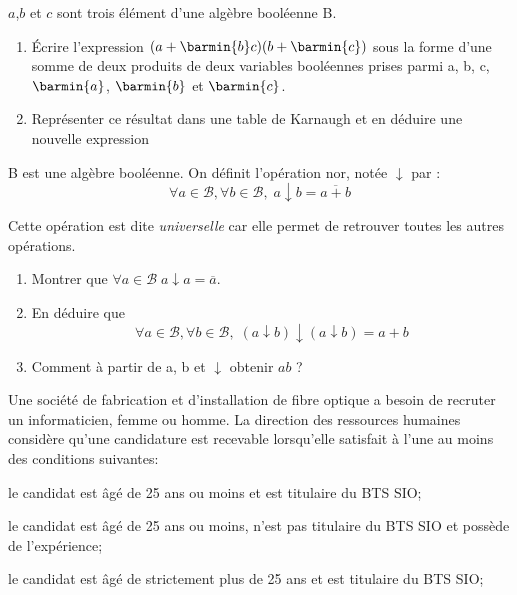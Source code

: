 \documentclass[a4paper,12pt,french]{article}
\begin{document}
\exo{}


$a$,$b$ et $c$ sont trois élément d'une algèbre booléenne B.

\begin{enumerate}[\bfseries 1.]
	\item 	\'Ecrire  l'expression $(a+\barmin{b}c)(b+\barmin{c})$ sous la forme d'une somme de deux produits de deux variables booléennes prises parmi a, b, c, $\barmin{a}
	$, $\barmin{b}$ et $\barmin{c}$.
	\item 	Représenter ce résultat dans une table de Karnaugh et en déduire une nouvelle expression\\
\end{enumerate}

\exo{}

B est une algèbre booléenne. On définit l'opération \og nor\fg{}, notée $\downarrow$ par : $$\forall a\in\mathcal{B},\forall b\in\mathcal{B},\; a\downarrow b = \overline{a+b}$$

Cette opération est dite \textit{universelle} car elle permet de retrouver toutes les autres opérations.

\begin{enumerate}[\bfseries 1.]
	\item 	Montrer que $\forall a\in\mathcal{B}\; a\downarrow a = \overline{a}$.
	\item 	En déduire que $$\forall a\in\mathcal{B},\forall b\in\mathcal{B},\; (a\downarrow b)\downarrow(a\downarrow b) = a+b$$
	\item 	Comment à partir de a, b et $\downarrow$ obtenir $ab$ ?\\
\end{enumerate}


Une société de fabrication et d'installation de fibre optique a besoin de recruter un informaticien, femme ou homme. La direction des ressources humaines considère qu'une candidature est recevable lorsqu'elle satisfait à l'une au moins des conditions suivantes:

\begin{list}{\textbullet}{}
	\item le candidat est âgé de 25 ans ou moins et est titulaire du BTS SIO;
	\item le candidat est âgé de 25 ans ou moins, n'est pas titulaire du BTS SIO et possède de l'expérience;
	\item le candidat est âgé de strictement plus de 25 ans  et est titulaire du BTS SIO;
\end{list}
\end{document}
